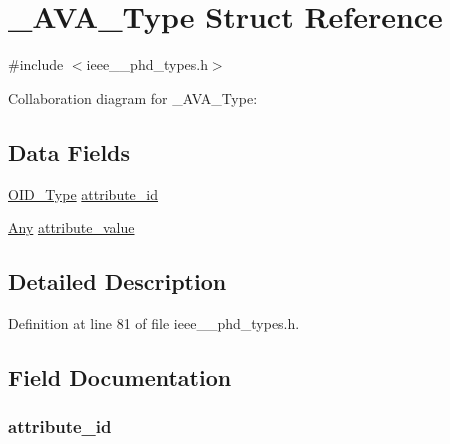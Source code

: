 \hypertarget{struct___a_v_a___type}{}\section{\+\_\+\+A\+V\+A\+\_\+\+Type Struct Reference}
\label{struct___a_v_a___type}


{\ttfamily \#include $<$ieee\+\_\+\_\+phd\+\_\+types.\+h$>$}



Collaboration diagram for \+\_\+\+A\+V\+A\+\_\+\+Type\+:
\subsection*{Data Fields}
\begin{DoxyCompactItemize}
\item 
\hyperlink{ieee__11073__phd__types_8h_aa4d7af235d4a95d6632aa0d64160dd62}{O\+I\+D\+\_\+\+Type} \hyperlink{struct___a_v_a___type_a13d36b15a15c3bcd026b413fe807d3cc}{attribute\+\_\+id}
\item 
\hyperlink{ieee__11073__phd__types_8h_a4decf91c0c44a2ed84549e41307f5fdb}{Any} \hyperlink{struct___a_v_a___type_a7b6c0cc70cd2d8cbc023b5a699487fbc}{attribute\+\_\+value}
\end{DoxyCompactItemize}


\subsection{Detailed Description}


Definition at line 81 of file ieee\+\_\+\_\+phd\+\_\+types.\+h.



\subsection{Field Documentation}
\hypertarget{struct___a_v_a___type_a13d36b15a15c3bcd026b413fe807d3cc}{}
\subsubsection[{attribute\+\_\+id}]{ attribute\+\_\+id}\label{struct___a_v_a___type_a13d36b15a15c3bcd026b413fe807d3cc}



